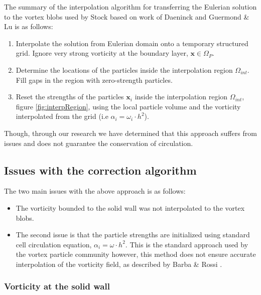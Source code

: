 The summary of the interpolation algorithm for transferring the Eulerian solution to the vortex blobs used by Stock based on work of Daeninck and Guermond \& Lu is as follows:
\begin{enumerate}
\item Interpolate the solution from Eulerian domain onto a temporary structured grid. Ignore very strong vorticity at the boundary layer, $\mathbf{x} \in \Omega_P$.
\item Determine the locations of the particles inside the interpolation region $\Omega_{int}$. Fill gaps in the region with zero-strength particles. 
\item Reset the strengths of the particles $\mathbf{x}_i$ inside the interpolation region $\Omega_{int}$, figure \ref{fig:interpRegion}, using the local particle volume and the vorticity interpolated from the grid (i.e $\alpha_i = \omega_i\cdot{h^2}$).
\end{enumerate}

Though, through our research we have determined that this approach suffers from issues and does not guarantee the conservation of circulation. 

\subsection{Issues with the correction algorithm}

The two main issues with the above approach is as follows:

\begin{itemize}
\item The vorticity bounded to the solid wall was not interpolated to the vortex blobs. 
\item The second issue is that the particle strengths are initialized using standard cell circulation equation, $\alpha_i = \omega \cdot h^2$. This is the standard approach used by the vortex particle community however, this method does not ensure accurate interpolation of the vorticity field, as described by Barba \& Rossi \cite{Barba2010a}.
\end{itemize}

\subsubsection{Vorticity at the solid wall}


